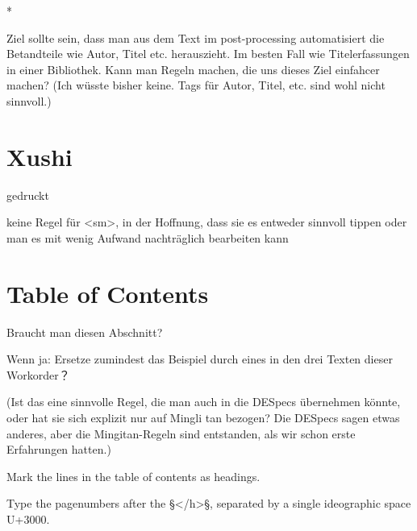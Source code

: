 \documentclass[fontsize=11pt, paper=a4, 
DIV15,
headings=normal,
parskip=half-, 
numbers=noenddot]{scrartcl}
\begin{document}
*

Ziel sollte sein, dass man aus dem Text im post-processing automatisiert die Betandteile wie Autor, Titel etc. herauszieht. Im besten Fall wie Titelerfassungen in einer Bibliothek. Kann man Regeln machen, die uns dieses Ziel einfahcer machen? (Ich wüsste bisher keine. Tags für Autor, Titel, etc. sind wohl nicht sinnvoll.)



\section{Xushi}

gedruckt

keine Regel für <sm>, in der Hoffnung, dass sie es entweder sinnvoll tippen oder man es mit wenig Aufwand nachträglich bearbeiten kann

\section{Table of Contents}
\label{toc}

Braucht man diesen Abschnitt?

Wenn ja: Ersetze zumindest das Beispiel durch eines in den drei Texten dieser Workorder？

(Ist das eine sinnvolle Regel, die man auch in die DESpecs übernehmen könnte, oder hat sie sich explizit nur auf Mingli tan bezogen? Die DESpecs sagen etwas anderes, aber die Mingitan-Regeln sind entstanden, als wir schon erste Erfahrungen hatten.)

\begin{mainrule}
Mark the lines in the table of contents as headings.
\end{mainrule}

\begin{clarification}
Type the pagenumbers after the §</h>§, separated by a single ideographic space U+3000.
\end{clarification}
\end{document}
